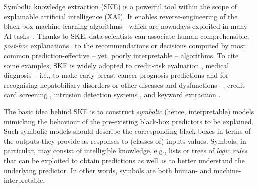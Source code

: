 \documentclass[
]{ceurart}
\begin{document}
Symbolic knowledge extraction (SKE) is a powerful tool within the scope of explainable artificial intelligence (XAI).
%
It enables reverse-engineering of the black-box machine learning algorithms---which are nowadays exploited in many AI tasks~\cite{rocha2012far}.
%
Thanks to SKE, data scientists can associate human-comprehensible, \emph{post-hoc} explanations~\cite{KENNY2021103459} to the recommendations or decisions computed by most common prediction-effective -- yet, poorly interpretable -- algorithms.
%
To cite some examples, SKE is widely adopted to credit-risk evaluation \cite{baesens2003using,baesens2001building,steiner2006using}, medical diagnosis -- i.e., to make early breast cancer prognosis predictions \cite{franco2007early} and for recognising hepatobiliary disorders \cite{hayashi2000comparison} or other diseases and dysfunctions \cite{bologna1997three} --, credit card screening \cite{setiono2011rule}, intrusion detection systems \cite{hofmann2003rule}, and keyword extraction \cite{azcarraga2012keyword}.

The basic idea behind SKE is to construct \emph{symbolic} (hence, interpretable) models mimicking the behaviour of the pre-existing black-box predictors to be explained.
%
Such symbolic models should describe the corresponding black boxes in terms of the outputs they provide as responses to (classes of) inputs values.
%
Symbols, in particular, may consist of intelligible knowledge, e.g., lists or trees of \emph{logic rules} that can be exploited to obtain predictions as well as to better understand the underlying predictor.
%
In other words, symbols are both human- and machine-interpretable.
\end{document}
